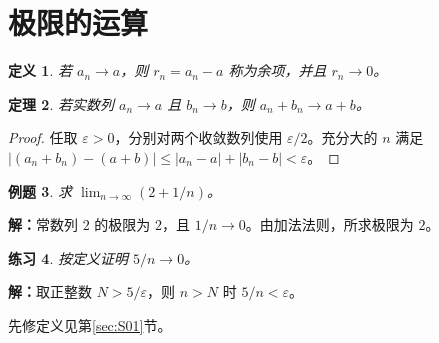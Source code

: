 \documentclass[UTF8,fontset=fandol,11pt]{ctexart}
\newtheorem{definition}{定义}[section]
\newtheorem{theorem}[definition]{定理}
\newtheorem{example}[definition]{例题}
\newtheorem{exercise}[definition]{练习}
\begin{document}
\section{极限的运算}\label{sec:S02}
\begin{definition}
若 $a_n\to a$，则 $r_n=a_n-a$ 称为余项，并且 $r_n\to0$。
\end{definition}
\begin{theorem}
\label{thm:later}若实数列 $a_n\to a$ 且 $b_n\to b$，则 $a_n+b_n\to a+b$。
\end{theorem}
\begin{proof}
任取 $\varepsilon>0$，分别对两个收敛数列使用 $\varepsilon/2$。充分大的 $n$ 满足 $|(a_n+b_n)-(a+b)|\leq |a_n-a|+|b_n-b|<\varepsilon$。
\end{proof}
\begin{example}
求 $\lim_{n\to\infty}(2+1/n)$。
\end{example}
\par\noindent\textbf{解：}常数列 $2$ 的极限为 $2$，且 $1/n\to0$。由加法法则，所求极限为 $2$。\par
\begin{exercise}
\label{mathagent:exercise:f708d5de6eeb2a0d1d46cddf76922686b9f273c43bd0798e15293c1e0afd54ab}
按定义证明 $5/n\to0$。
\end{exercise}
\par\noindent\textbf{解：}取正整数 $N>5/\varepsilon$，则 $n>N$ 时 $5/n<\varepsilon$。\par
先修定义见第\ref{sec:S01}节。\par
\end{document}
